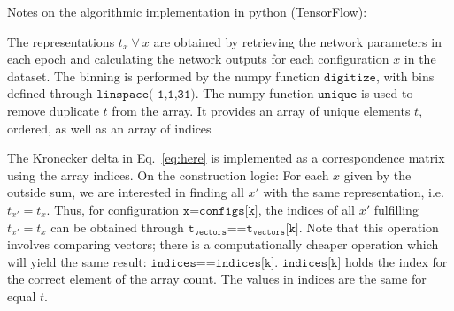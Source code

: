 \documentclass[12pt]{report}
\begin{document}
Notes on the algorithmic implementation in python (TensorFlow):

The representations $t_x~\forall~x$ are obtained by retrieving the network parameters in each epoch and calculating the network outputs for each configuration $x$ in the dataset. The binning is performed by the numpy function $\texttt{digitize}$, with bins defined through $\texttt{linspace(-1,1,31)}$. The numpy function $\texttt{unique}$ is used to remove duplicate $t$ from the array. It provides an array of unique elements $t$, ordered, as well as an array of indices 


The Kronecker delta in Eq.~\eqref{eq:here} is implemented as a correspondence matrix using the array indices. 
On the construction logic: For each $x$ given by the outside sum, we are interested in finding all $x'$ with the same representation, i.e. $t_{x'} = t_x$. Thus, for configuration $\texttt{x=configs[k]}$, the indices of all $x'$ fulfilling $t_{x'} = t_x$ can be obtained through $\texttt{t}_{\texttt{vectors}}\texttt{==t}_{\texttt{vectors}}\texttt{[k]}$. Note that this operation involves comparing vectors; there is a computationally cheaper operation which will yield the same result: $\texttt{indices==indices[k]}$.
$\texttt{indices[k]}$ holds the index for the correct element of the array count. 
The values in indices are the same for equal $t$.
\end{document}
